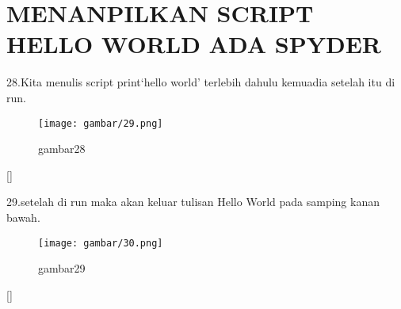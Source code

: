 \section{MENANPILKAN SCRIPT HELLO WORLD ADA SPYDER}
\item 28.Kita menulis script print{‘hello world’} terlebih dahulu kemuadia setelah itu di run.
\begin{figure}[h]
    \centering
    \texttt{[image: gambar/29.png]}
    \caption{gambar28}
    \label{fig:my_label}
\end{figure}[]
\item 29.setelah di run maka akan keluar tulisan Hello World pada samping kanan bawah.
\begin{figure}[h]
    \centering
    \texttt{[image: gambar/30.png]}
    \caption{gambar29}
    \label{fig:my_label}
\end{figure}[]




